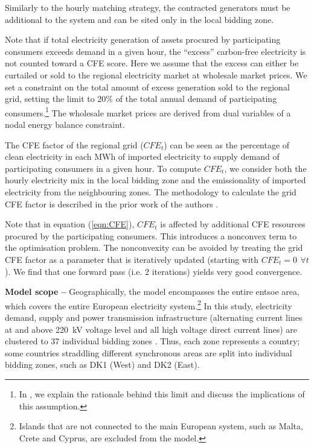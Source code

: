 Similarly to the hourly matching strategy, the contracted generators must be additional to the system and can be sited only in the local bidding zone.

Note that if total electricity generation of assets procured by participating consumers exceeds demand in a given hour, the \enquote{excess} carbon-free electricity is not counted toward a CFE score.
Here we assume that the excess can either be curtailed or sold to the regional electricity market at wholesale market prices.
We set a constraint on the total amount of excess generation sold to the regional grid, setting the limit to 20\% of the total annual demand of participating consumers.\footnote{In , we explain the rationale behind this limit and discuss the implications of this assumption.}
The wholesale market prices are derived from dual variables of a nodal energy balance constraint.

The CFE factor of the regional grid ($CFE_t$) can be seen as the percentage of clean electricity in each MWh of imported electricity to supply demand of participating consumers in a given hour.
To compute $CFE_t$, we consider both the hourly electricity mix in the local bidding zone and the emissionality of imported electricity from the neighbouring zones.
The methodology to calculate the grid CFE factor is described in the prior work of the authors \cite{riepin-zenodo-systemlevel247}.

Note that in equation (\ref{eqn:CFE}), $CFE_t$ is affected by additional CFE resources procured by the participating consumers.
This introduces a nonconvex term to the optimisation problem.
The nonconvexity can be avoided by treating the grid CFE factor as a parameter that is iteratively updated (starting with $CFE_t =0 \,~\forall t$).
We find that one forward pass (i.e. 2 iterations) yields very good convergence.


\textbf{Model scope --} Geographically, the model encompasses the entire \gls{entsoe} area, which covers the entire European electricity system.\footnote{Islands that are not connected to the main European system, such as Malta, Crete and Cyprus, are excluded from the model.}
In this study, electricity demand, supply and power transmission infrastructure (alternating current lines at and above 220~kV voltage level and all high voltage direct current lines) are clustered to 37 individual bidding zones \cite{PyPSAEur-docs-spatialresolution}.
Thus, each zone represents a country; some countries straddling different synchronous areas are split into individual bidding zones, such as DK1 (West) and DK2 (East).

